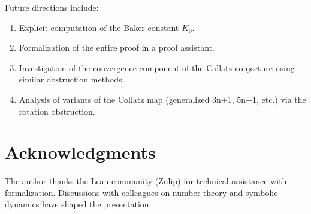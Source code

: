\documentclass[12pt,a4paper]{amsart}
\theoremstyle{plain}
\theoremstyle{definition}
\begin{document}
Future directions include:
\begin{enumerate}
\item Explicit computation of the Baker constant $K_0$.
\item Formalization of the entire proof in a proof assistant.
\item Investigation of the convergence component of the Collatz conjecture using similar obstruction methods.
\item Analysis of variants of the Collatz map (generalized 3n+1, 5n+1, etc.) via the rotation obstruction.
\end{enumerate}

\section*{Acknowledgments}

The author thanks the Lean community (Zulip) for technical assistance with formalization. Discussions with colleagues on number theory and symbolic dynamics have shaped the presentation.
\end{document}

